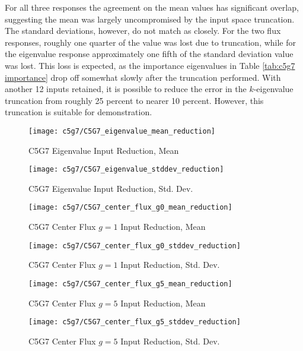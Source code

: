For all three responses the agreement on the mean values has significant overlap, suggesting the mean was
largely uncompromised by the input space truncation.  The standard deviations, however, do not match as
closely.  For the two flux responses, roughly one quarter of the value was lost due to truncation, while for the
eigenvalue response approximately one fifth of the standard deviation value was lost.  This loss is expected,
as the importance eigenvalues in Table \ref{tab:c5g7 importance} drop off somewhat slowly after the truncation
performed.  With another 12 inputs retained, it is possible to reduce the error in the $k$-eigenvalue
truncation from roughly 25 percent to nearer 10 percent.  However, this truncation is suitable for
demonstration.
\begin{figure}[H]
  \centering
  \texttt{[image: c5g7/C5G7\_eigenvalue\_mean\_reduction]}
  \caption{C5G7 Eigenvalue Input Reduction, Mean}
  \label{fig:c5g7 eigenvalue red mean}
\end{figure}
\begin{figure}[H]
  \centering
  \texttt{[image: c5g7/C5G7\_eigenvalue\_stddev\_reduction]}
  \caption{C5G7 Eigenvalue Input Reduction, Std. Dev.}
  \label{fig:c5g7 eigenvalue red stdev}
\end{figure}
\begin{figure}[H]
  \centering
  \texttt{[image: c5g7/C5G7\_center\_flux\_g0\_mean\_reduction]}
  \caption{C5G7 Center Flux $g=1$ Input Reduction, Mean}
  \label{fig:c5g7 center_flux_g0 red mean}
\end{figure}
\begin{figure}[H]
  \centering
  \texttt{[image: c5g7/C5G7\_center\_flux\_g0\_stddev\_reduction]}
  \caption{C5G7 Center Flux $g=1$ Input Reduction, Std. Dev.}
  \label{fig:c5g7 center_flux_g0 red stdev}
\end{figure}
\begin{figure}[H]
  \centering
  \texttt{[image: c5g7/C5G7\_center\_flux\_g5\_mean\_reduction]}
  \caption{C5G7 Center Flux $g=5$ Input Reduction, Mean}
  \label{fig:c5g7 center_flux_g5 red mean}
\end{figure}
\begin{figure}[H]
  \centering
  \texttt{[image: c5g7/C5G7\_center\_flux\_g5\_stddev\_reduction]}
  \caption{C5G7 Center Flux $g=5$ Input Reduction, Std. Dev.}
  \label{fig:c5g7 center_flux_g5 red stdev}
\end{figure}

